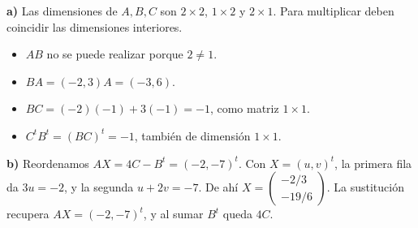 \textbf{a)} Las dimensiones de $A,B,C$ son $2\times2$,
$1\times2$ y $2\times1$. Para multiplicar deben coincidir
las dimensiones interiores.
\begin{itemize}
\item $AB$ no se puede realizar porque $2\ne1$.
\item $BA=(-2,3)A=\boxed{(-3,6)}$.
\item $BC=(-2)(-1)+3(-1)=\boxed{-1}$, como matriz $1\times1$.
\item $C^tB^t=(BC)^t=\boxed{-1}$, también de dimensión $1\times1$.
\end{itemize}
\textbf{b)} Reordenamos $AX=4C-B^t=(-2,-7)^t$.
Con $X=(u,v)^t$, la primera fila da $3u=-2$, y la segunda
$u+2v=-7$. De ahí
$\boxed{X=\begin{pmatrix}-2/3\\-19/6\end{pmatrix}}$.
La sustitución recupera $AX=(-2,-7)^t$, y al sumar $B^t$ queda $4C$.
